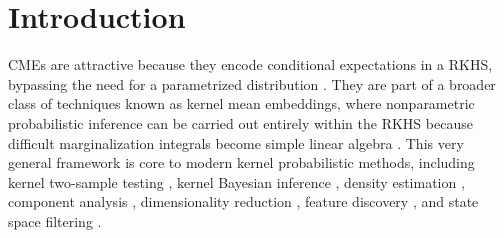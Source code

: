 \documentclass{llncs}
\begin{document}
	\section{Introduction}
	\label{sec:introduction}
	
	
	
	
	
	
	\Glspl{CME} are attractive because they encode conditional expectations in a \gls{RKHS}, bypassing the need for a parametrized distribution \citep{song2013kernel}. They are part of a broader class of techniques known as kernel mean embeddings, where nonparametric probabilistic inference can be carried out entirely within the \gls{RKHS} because difficult marginalization integrals become simple linear algebra \citep{muandet2016kernel}. This very general framework is core to modern kernel probabilistic methods, including kernel two-sample testing \citep{gretton2007kernel}, kernel Bayesian inference  \citep{fukumizu2013kernel}, density estimation \citep{song2008tailoring, kanagawa2014recovering}, component analysis \citep{muandet2013domain}, dimensionality reduction \citep{fukumizu2004dimensionality}, feature discovery \citep{jitkrittum2016interpretable}, and state space filtering \citep{kanagawa2016filtering}.
	
	
	
	
	
\end{document}
